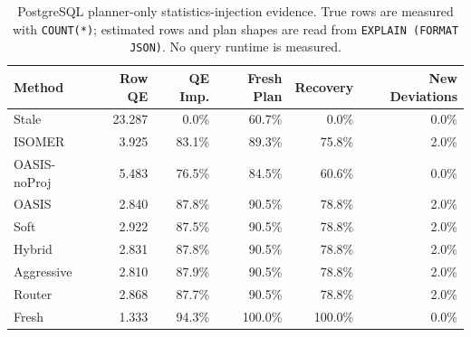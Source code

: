 \begin{table}[t]
  \centering
  \small
  \caption{PostgreSQL planner-only statistics-injection evidence. True rows are measured with \texttt{COUNT(*)}; estimated rows and plan shapes are read from \texttt{EXPLAIN (FORMAT JSON)}. No query runtime is measured.}
  \label{tab:postgres_planner_stats_injection}
  \setlength{\tabcolsep}{4pt}
  \begin{tabular}{lrrrrr}
    \toprule
    Method & Row QE & QE Imp. & Fresh Plan & Recovery & New Deviations \\
    \midrule
    Stale & 23.287 & 0.0\% & 60.7\% & 0.0\% & 0.0\% \\
    ISOMER & 3.925 & 83.1\% & 89.3\% & 75.8\% & 2.0\% \\
    OASIS-noProj & 5.483 & 76.5\% & 84.5\% & 60.6\% & 0.0\% \\
    OASIS & 2.840 & 87.8\% & 90.5\% & 78.8\% & 2.0\% \\
    Soft & 2.922 & 87.5\% & 90.5\% & 78.8\% & 2.0\% \\
    Hybrid & 2.831 & 87.8\% & 90.5\% & 78.8\% & 2.0\% \\
    Aggressive & 2.810 & 87.9\% & 90.5\% & 78.8\% & 2.0\% \\
    Router & 2.868 & 87.7\% & 90.5\% & 78.8\% & 2.0\% \\
    Fresh & 1.333 & 94.3\% & 100.0\% & 100.0\% & 0.0\% \\
    \bottomrule
  \end{tabular}
\end{table}
